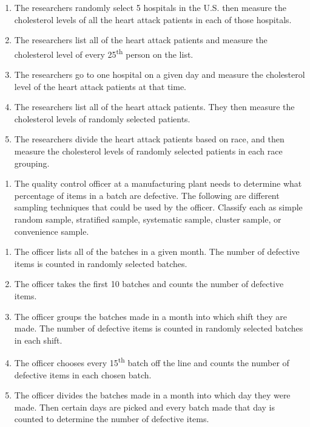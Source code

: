 \documentclass[]{book}
\providecommand{\tightlist}{%
  \setlength{\itemsep}{0pt}\setlength{\parskip}{0pt}}
\begin{document}
\begin{enumerate}
\def\labelenumi{\alph{enumi}.}
\item
  The researchers randomly select 5 hospitals in the U.S. then measure
  the cholesterol levels of all the heart attack patients in each of
  those hospitals.
\item
  The researchers list all of the heart attack patients and measure
  the cholesterol level of every 25\textsuperscript{th} person on the list.
\item
  The researchers go to one hospital on a given day and measure the
  cholesterol level of the heart attack patients at that time.
\item
  The researchers list all of the heart attack patients. They then
  measure the cholesterol levels of randomly selected patients.
\item
  The researchers divide the heart attack patients based on race, and
  then measure the cholesterol levels of randomly selected patients in
  each race grouping.
\end{enumerate}

\begin{enumerate}
\def\labelenumi{\arabic{enumi}.}
\setcounter{enumi}{1}
\tightlist
\item
  The quality control officer at a manufacturing plant needs to
  determine what percentage of items in a batch are defective. The
  following are different sampling techniques that could be used by
  the officer. Classify each as simple random sample, stratified
  sample, systematic sample, cluster sample, or convenience sample.
\end{enumerate}

\begin{enumerate}
\def\labelenumi{\alph{enumi}.}
\item
  The officer lists all of the batches in a given month. The number of
  defective items is counted in randomly selected batches.
\item
  The officer takes the first 10 batches and counts the number of
  defective items.
\item
  The officer groups the batches made in a month into which shift they
  are made. The number of defective items is counted in randomly
  selected batches in each shift.
\item
  The officer chooses every 15\textsuperscript{th} batch off the line and counts the
  number of defective items in each chosen batch.
\item
  The officer divides the batches made in a month into which day they
  were made. Then certain days are picked and every batch made that
  day is counted to determine the number of defective items.
\end{enumerate}
\end{document}
